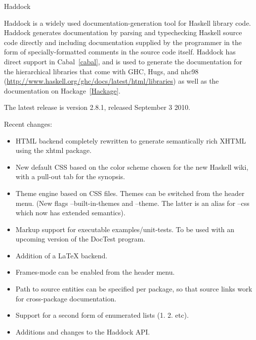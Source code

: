 \begin{hcarentry}{Haddock}
\label{haddock}
\makeheader

Haddock is a widely used documentation-generation tool for Haskell
library code.  Haddock generates documentation by parsing and typechecking
Haskell source code directly and including documentation supplied by the
programmer in the form of specially-formatted comments in the source code
itself.  Haddock has direct support in Cabal~\cref{cabal}, and is used to
generate the documentation for the hierarchical libraries that come with GHC,
Hugs, and nhc98
(\url{http://www.haskell.org/ghc/docs/latest/html/libraries}) as well as
the documentation on Hackage~\cref{Hackage}.

The latest release is version 2.8.1, released September 3 2010.

\Separate
Recent changes:
\begin{itemize}

\item HTML backend completely rewritten to generate semantically rich XHTML
      using the xhtml package.

\item New default CSS based on the color scheme chosen for the new Haskell
      wiki, with a pull-out tab for the synopsis.

\item Theme engine based on CSS files. Themes can be switched from the
      header menu. (New flags --built-in-themes and --theme. The latter
      is an alias for --css which now has extended semantics).

\item Markup support for executable examples/unit-tests. To be used with an
      upcoming version of the DocTest program.

\item Addition of a LaTeX backend.

\item Frames-mode can be enabled from the header menu.

\item Path to source entities can be specified per package, so that source
      links work for cross-package documentation.

\item Support for a second form of enumerated lists (1. 2. etc).

\item Additions and changes to the Haddock API.


\end{itemize}
\end{hcarentry}
